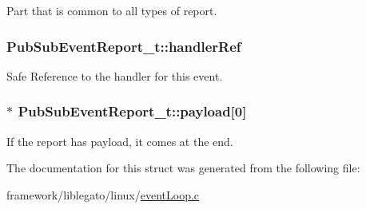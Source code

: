 Part that is common to all types of report. 

\subsubsection[{\texorpdfstring{handler\+Ref}{handlerRef}}]{ Pub\+Sub\+Event\+Report\+\_\+t\+::handler\+Ref}\hypertarget{struct_pub_sub_event_report__t_af15c8b515622b3484191355b4f8d2ad2}{}\label{struct_pub_sub_event_report__t_af15c8b515622b3484191355b4f8d2ad2}


Safe Reference to the handler for this event. 

\subsubsection[{\texorpdfstring{payload}{payload}}]{$\ast$ Pub\+Sub\+Event\+Report\+\_\+t\+::payload\mbox{[}0\mbox{]}}\hypertarget{struct_pub_sub_event_report__t_a3e532f669933750e7fc69d1487047dfd}{}\label{struct_pub_sub_event_report__t_a3e532f669933750e7fc69d1487047dfd}


If the report has payload, it comes at the end. 



The documentation for this struct was generated from the following file\+:\begin{DoxyCompactItemize}
\item 
framework/liblegato/linux/\hyperlink{event_loop_8c}{event\+Loop.\+c}\end{DoxyCompactItemize}
